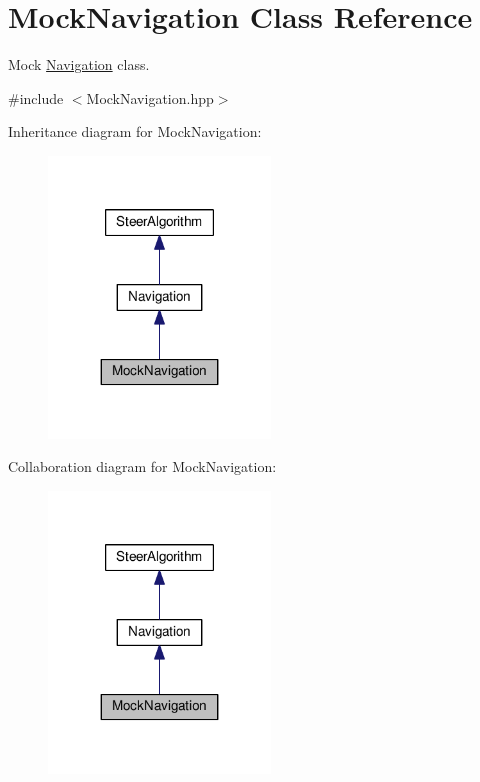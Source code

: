 \hypertarget{class_mock_navigation}{}\section{Mock\+Navigation Class Reference}
\label{class_mock_navigation}


Mock \hyperlink{class_navigation}{Navigation} class.  




{\ttfamily \#include $<$Mock\+Navigation.\+hpp$>$}



Inheritance diagram for Mock\+Navigation\+:
\nopagebreak
\begin{figure}[H]
\begin{center}
\leavevmode
\includegraphics[width=167pt]{class_mock_navigation__inherit__graph}
\end{center}
\end{figure}


Collaboration diagram for Mock\+Navigation\+:
\nopagebreak
\begin{figure}[H]
\begin{center}
\leavevmode
\includegraphics[width=167pt]{class_mock_navigation__coll__graph}
\end{center}
\end{figure}
